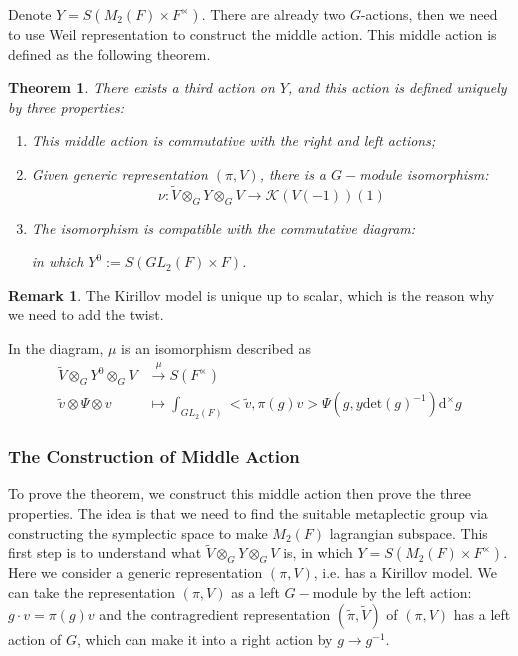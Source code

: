 \documentclass[12pt,a4paper,english]{article}
\theoremstyle{plain}
\newtheorem{thm}{Theorem}[section]
\theoremstyle{definition}
\newtheorem*{rem}{Remark}
\newcommand{\mulldif}{\mathrm{d}^{\times}}
\newcommand{\det}{\text{det}}
\begin{document}
Denote $Y=S(M_{2}(F)\times F^{\times})$. There are already two $G$-actions, then we need to use Weil representation to construct the middle action. This middle action is defined as the following theorem.
\begin{thm}\label{thm2.2}
There exists a third action on $Y$, and this action is defined uniquely by three properties:
\begin{enumerate}
    \item This middle action is commutative with the right and left actions;
    \item Given generic representation $(\pi, V)$, there is a $G-$module isomorphism:
    \begin{equation*}
        \nu:\widetilde{V}\otimes_{G}Y\otimes_{G}V\rightarrow\mathcal{K}(V(-1))(1)
    \end{equation*}
    \item The isomorphism is compatible with the commutative diagram:
\begin{center}
\end{center}
in which $Y^{0}:=S(GL_{2}(F)\times F)$.
\end{enumerate}
\end{thm}
\begin{rem}
The Kirillov model is unique up to scalar, which is the reason why we need to add the twist.

In the diagram, $\mu$ is an isomorphism described as  \begin{align*}
    \widetilde{V}\otimes_{G}Y^{0}\otimes_{G}V&\xrightarrow{\mu} S(F^{\times}) \\
    \widetilde{v}\otimes \Psi\otimes v&\mapsto \int_{GL_{2}(F)}<\tilde{v},\pi(g)v>\Psi(g,y\det(g)^{-1})\mulldif g
\end{align*}
\end{rem}
\subsubsection{The Construction of Middle Action}
To prove the theorem, we construct this middle action then prove the three properties. 
The idea is that we need to find the suitable metaplectic group via constructing the symplectic space to make $M_{2}(F)$ lagrangian subspace. This first step is to understand what $\widetilde{V}\otimes_{G}Y\otimes_{G}V$ is, in which $Y=S(M_{2}(F)\times F^{\times})$. Here we consider a generic representation $(\pi, V)$, i.e. has a Kirillov model. We can take the representation $(\pi, V)$ as a left $G-$module by the left action: $g\cdot v=\pi(g)v$ and the contragredient representation $(\tilde{\pi}, \widetilde{V})$ of $(\pi, V)$ has a left action of $G$, which can make it into a right action by $g\rightarrow g^{-1}$.
\end{document}
